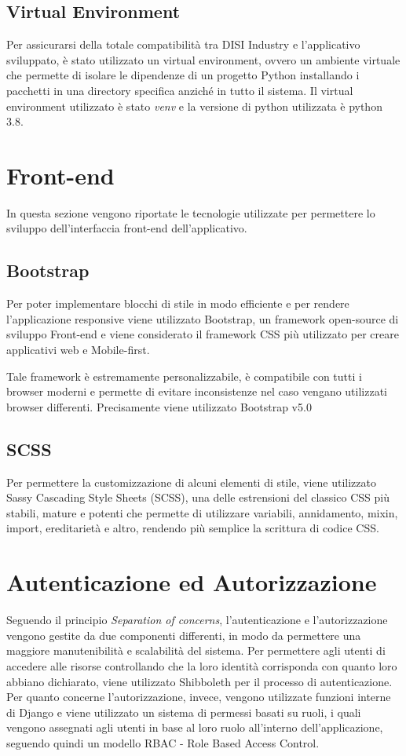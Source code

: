 \subsection{Virtual Environment}
Per assicurarsi della totale compatibilità tra DISI Industry e l'applicativo sviluppato, è stato utilizzato un virtual environment, ovvero un ambiente virtuale che permette di isolare le dipendenze di un progetto Python installando i pacchetti in una directory specifica anziché in tutto il sistema. Il virtual environment utilizzato è stato \textit{venv} \cite{venv} e la versione di python utilizzata è python 3.8.



\section{Front-end}
In questa sezione vengono riportate le tecnologie utilizzate per permettere lo sviluppo dell'interfaccia front-end dell'applicativo. 
\subsection{Bootstrap}
Per poter implementare blocchi di stile in modo efficiente e per rendere l'applicazione responsive viene utilizzato Bootstrap, un framework open-source di sviluppo Front-end e viene considerato il framework CSS più utilizzato per creare applicativi web e Mobile-first.

Tale framework è estremamente personalizzabile, è compatibile con tutti i browser moderni e permette di evitare inconsistenze nel caso vengano utilizzati browser differenti.
Precisamente viene utilizzato Bootstrap v5.0 \cite{bootstrap}

\subsection{SCSS}
Per permettere la customizzazione di alcuni elementi di stile, viene utilizzato Sassy Cascading Style Sheets (SCSS), una delle estrensioni del classico CSS più stabili, mature e potenti che permette di utilizzare variabili, annidamento, mixin, import, ereditarietà e altro, rendendo più semplice la scrittura di codice CSS. \cite{scss}

\section{Autenticazione ed Autorizzazione}
Seguendo il principio \textit{Separation of concerns}, l'autenticazione e l'autorizzazione vengono gestite da due componenti differenti, in modo da permettere una maggiore manutenibilità e scalabilità del sistema.
Per permettere agli utenti di accedere alle risorse controllando che la loro identità corrisponda con quanto loro abbiano dichiarato, viene utilizzato Shibboleth per il processo di autenticazione. Per quanto concerne l'autorizzazione, invece, vengono utilizzate funzioni interne di Django e viene utilizzato un sistema di permessi basati su ruoli, i quali vengono assegnati agli utenti in base al loro ruolo all'interno dell'applicazione, seguendo quindi un modello RBAC - Role Based Access Control.



